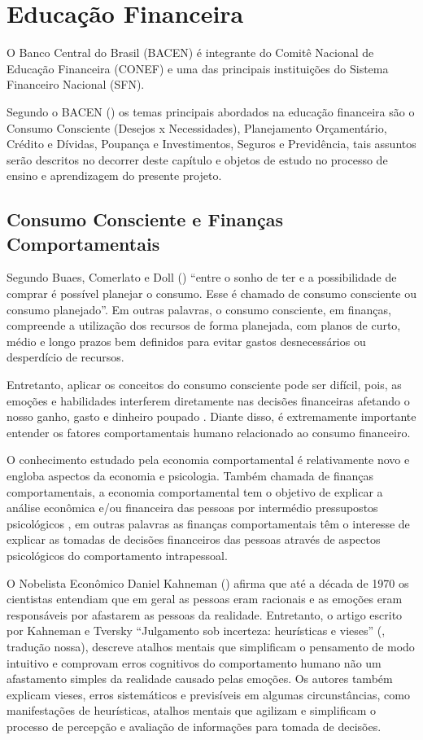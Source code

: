 \section{Educação Financeira}
O Banco Central do Brasil (BACEN) é integrante do Comitê Nacional de Educação Financeira (CONEF) e uma das principais instituições do Sistema Financeiro Nacional (SFN).

Segundo o BACEN (\citeyear{bacen2013}) os temas principais abordados na educação financeira são o Consumo Consciente (Desejos x Necessidades), Planejamento Orçamentário, Crédito e Dívidas, Poupança e Investimentos, Seguros e Previdência, tais assuntos serão descritos no decorrer deste capítulo e objetos de estudo no processo de ensino e aprendizagem do presente projeto.

\subsection{Consumo Consciente e Finanças Comportamentais}
Segundo Buaes, Comerlato e Doll (\citeyear{buaes2015}) “entre o sonho de ter e a possibilidade de comprar é possível planejar o consumo. Esse é chamado de consumo consciente ou consumo planejado”. Em outras palavras, o consumo consciente, em finanças, compreende a utilização dos recursos de forma planejada, com planos de curto, médio e longo prazos bem definidos para evitar gastos desnecessários ou desperdício de recursos.

Entretanto, aplicar os conceitos do consumo consciente pode ser difícil, pois, as emoções e habilidades interferem diretamente nas decisões financeiras afetando o nosso ganho, gasto e dinheiro poupado \cite{martins2004}. Diante disso, é extremamente importante entender os fatores comportamentais humano relacionado ao consumo financeiro.

O conhecimento estudado pela economia comportamental é relativamente novo e engloba aspectos da economia e psicologia. Também chamada de finanças comportamentais, a economia comportamental tem o objetivo de explicar a análise econômica e/ou financeira das pessoas por intermédio pressupostos psicológicos \cite{castro2014}, em outras palavras as finanças comportamentais têm o interesse de explicar as tomadas de decisões financeiros das pessoas através de aspectos psicológicos do comportamento intrapessoal.

O Nobelista Econômico Daniel Kahneman (\citeyear{kahneman2012}) afirma que até a década de 1970 os cientistas entendiam que em geral as pessoas eram racionais e as emoções eram responsáveis por afastarem as pessoas da realidade. Entretanto, o artigo escrito por Kahneman e Tversky “Julgamento sob incerteza: heurísticas e vieses” (\citeyear{kahneman1974}, tradução nossa), descreve atalhos mentais que simplificam o pensamento de modo intuitivo e comprovam erros cognitivos do comportamento humano não um afastamento simples da realidade causado pelas emoções. Os autores também explicam vieses, erros sistemáticos e previsíveis em algumas circunstâncias, como manifestações de heurísticas, atalhos mentais que agilizam e simplificam o processo de percepção e avaliação de informações para tomada de decisões.

